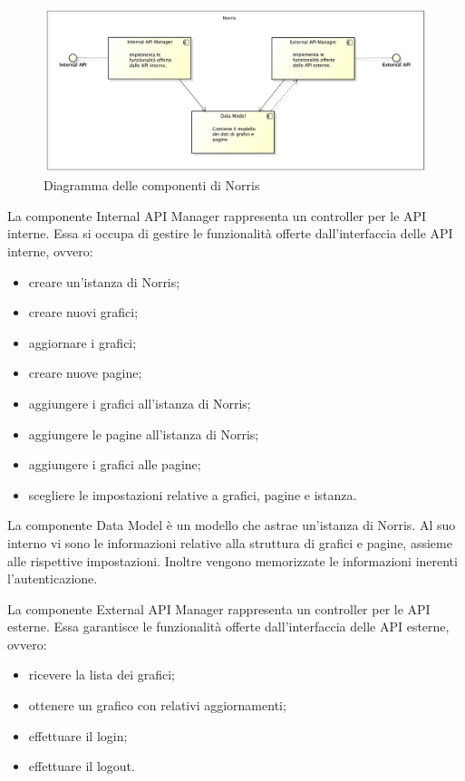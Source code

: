 
	\begin{figure}[H]\centering
        \includegraphics[width=\textwidth]{SpecificaTecnica/Pics/ComponentiNorris}
        \caption{Diagramma delle componenti di Norris}
    \end{figure}



			La componente Internal API Manager rappresenta un controller per le API interne. Essa si occupa di gestire le funzionalità offerte dall'interfaccia delle API interne, ovvero:
			\begin{itemize}
				\item creare un'istanza di Norris;
				\item creare nuovi grafici;
				\item aggiornare i grafici;
				\item creare nuove pagine;
				\item aggiungere i grafici all'istanza di Norris;
				\item aggiungere le pagine all'istanza di Norris;
				\item aggiungere i grafici alle pagine;
				\item scegliere le impostazioni relative a grafici, pagine e istanza.
			\end{itemize}


			La componente Data Model è un modello che astrae un'istanza di Norris. Al suo interno vi sono le informazioni relative alla struttura di grafici e pagine, assieme alle rispettive impostazioni. Inoltre vengono memorizzate le informazioni inerenti l'autenticazione.

			La componente External API Manager rappresenta un controller per le API esterne. Essa garantisce le funzionalità offerte dall'interfaccia delle API esterne, ovvero:
			\begin{itemize}
				\item ricevere la lista dei grafici;
				\item ottenere un grafico con relativi aggiornamenti;
				\item effettuare il login;
				\item effettuare il logout.
			\end{itemize}

